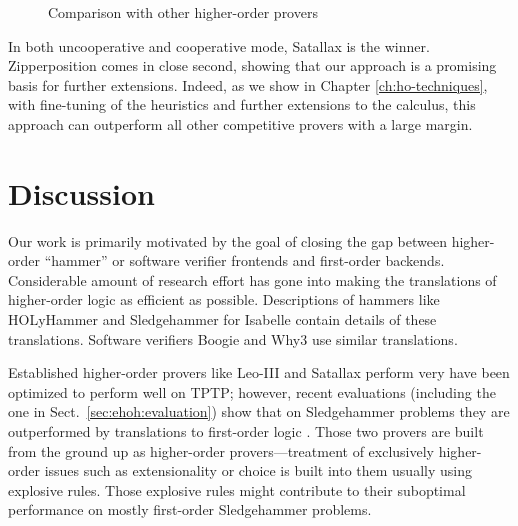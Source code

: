 \begin{figure}[t]
  \label{fig:higher-order-provers}
  \begin{center}
    \def\arraystretch{1.1}%
    \caption{Comparison with other higher-order provers}
  \end{center}
\end{figure}

In both uncooperative and cooperative mode, Satallax is the winner. Zipperposition comes
in close second, showing that our approach is a promising basis for further
extensions. Indeed, as we show in Chapter \ref{ch:ho-techniques}, with
fine-tuning of the heuristics and further extensions to the calculus, this
approach can outperform all other competitive provers with a large margin.

\section{Discussion}
\label{sect:bool:discussion}

Our work is primarily motivated by the goal of closing the gap between
higher-order ``hammer'' or software verifier frontends and first-order backends.
Considerable amount of research effort has gone into making the translations of
higher-order logic as efficient as possible. Descriptions of hammers like
HOLyHammer \cite{ku-15-holyhammer} and Sledgehammer
\cite{pb-12-sh} for Isabelle contain details of these
translations. Software verifiers Boogie \cite{lr-10-boogie} and Why3
\cite{bfcp-11-why3} use similar translations.

Established higher-order provers like Leo-III and Satallax perform very
have been optimized to perform well on TPTP; however, recent evaluations (including the one in Sect.~\ref{sec:ehoh:evaluation}) show that on Sledgehammer
problems they are outperformed by translations to first-order logic
\cite{bbtvw-21-sup-lam, %
cbetal-11-cvc4}. Those two provers are built from the ground up as
higher-order provers---treatment of exclusively higher-order issues such as
extensionality or choice is built into them usually using explosive rules. Those
explosive rules might contribute to their suboptimal performance on mostly
first-order Sledgehammer problems.

